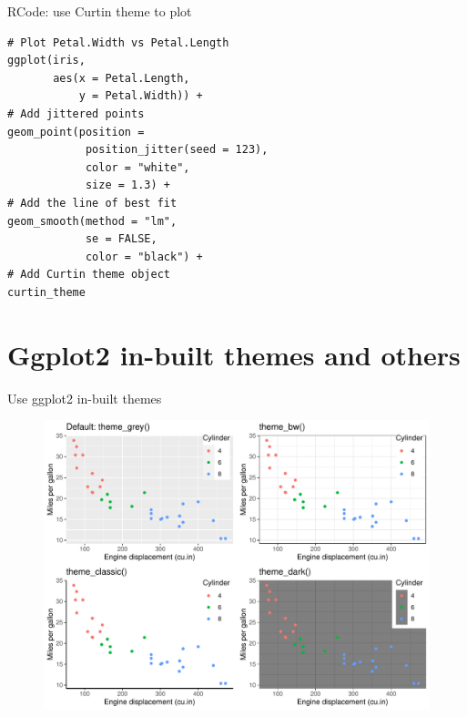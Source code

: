\documentclass{beamer}
\begin{document}
\begin{frame}[fragile]{RCode: use Curtin theme to plot}
\begin{lstlisting}
# Plot Petal.Width vs Petal.Length
ggplot(iris, 
       aes(x = Petal.Length,
           y = Petal.Width)) +
# Add jittered points
geom_point(position = 
            position_jitter(seed = 123), 
            color = "white",
            size = 1.3) +
# Add the line of best fit
geom_smooth(method = "lm", 
            se = FALSE, 
            color = "black") +
# Add Curtin theme object
curtin_theme
\end{lstlisting}
\end{frame}

\section{Ggplot2 in-built themes and others}

\begin{frame}{Use ggplot2 in-built themes}
\begin{figure}
\includegraphics[width=0.99\linewidth]{PlotsLec3/InBuiltTheme}
\end{figure}
\end{frame}
\end{document}
